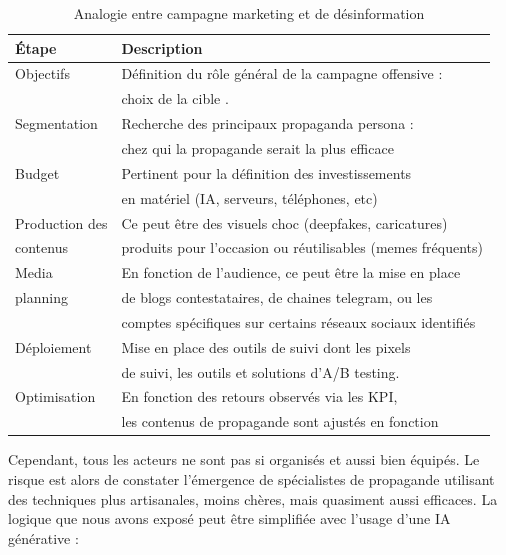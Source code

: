 \documentclass[11pt]{article}
\begin{document}
		\begin{table}[H]
			\centering
			\begin{tabular}{|l|l|}
				\hline 
				Étape & Description \\
				\hline 
				Objectifs & Définition du rôle général de la campagne offensive : \\
				 & choix de la cible . \\
				\hline 
				Segmentation & Recherche des principaux propaganda persona : \\
				 &  chez qui la propagande serait la plus efficace \\
				\hline 
				Budget & Pertinent pour la définition des investissements \\
				 & en matériel (IA, serveurs, téléphones, etc) \\
				\hline 
				Production des  & Ce peut être des visuels choc (deepfakes, caricatures)\\
				contenus & produits pour l'occasion ou réutilisables (memes fréquents) \\
				\hline 
				Media  & En fonction de l'audience, ce peut être la mise en place \\
				planning & de blogs contestataires, de chaines telegram, ou les \\
				 & comptes spécifiques sur certains réseaux sociaux identifiés \\
				\hline 
				Déploiement & Mise en place des outils de suivi dont les pixels \\
				 & de suivi, les outils et solutions d'A/B testing. \\
				\hline 
				Optimisation & En fonction des retours observés via les KPI, \\
				 & les contenus de propagande sont ajustés en fonction \\
				\hline 
			\end{tabular}
			\caption{Analogie entre campagne marketing et de désinformation}
		\end{table}
			

	
		Cependant, tous les acteurs ne sont pas si organisés et aussi bien équipés. Le risque est alors de constater l'émergence de spécialistes de propagande utilisant des techniques plus artisanales, moins chères, mais quasiment aussi efficaces. La logique que nous avons exposé peut être simplifiée avec l'usage d'une IA générative : 
		
\end{document}
